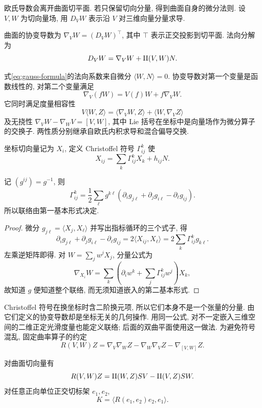 \par{}
欧氏导数会离开曲面切平面. 若只保留切向分量, 得到曲面自身的微分法则. 设 $V,W$ 为切向量场, 用 $D_VW$ 表示沿 $V$ 对三维向量分量求导.
\begin{definition}
曲面的协变导数为 $\nabla_VW=(D_VW)^{\top}$, 其中 $\top$ 表示正交投影到切平面. 法向分解为
\begin{equation}\label{eq:gauss-formula}
 D_VW=\nabla_VW+\mathrm{II}(V,W)N.
\end{equation}
\end{definition}
式\eqref{eq:gauss-formula}的法向系数来自微分 $\langle W,N\rangle=0$. 协变导数对第一个变量是函数线性的, 对第二个变量满足
\[
 \nabla_V(fW)=V(f)W+f\nabla_VW.
\]
它同时满足度量相容性
\[
 V\langle W,Z\rangle=\langle\nabla_VW,Z\rangle+\langle W,\nabla_VZ\rangle
\]
及无挠性 $\nabla_VW-\nabla_WV=[V,W]$, 其中 Lie 括号在坐标中是向量场作为微分算子的交换子. 两性质分别继承自欧氏内积求导和混合偏导交换.
\begin{definition}
坐标切向量记为 $X_i$, 定义 Christoffel 符号 $\Gamma^k_{ij}$ 使
\[
 X_{ij}=\sum_k\Gamma^k_{ij}X_k+h_{ij}N.
\]
\end{definition}
\begin{proposition}\label{prop:christoffel}
记 $(g^{ij})=g^{-1}$, 则
\begin{equation}\label{eq:christoffel}
 \Gamma^k_{ij}=\frac12\sum_\ell g^{k\ell}
 (\partial_i g_{j\ell}+\partial_j g_{i\ell}-\partial_\ell g_{ij}).
\end{equation}
所以联络由第一基本形式决定.
\end{proposition}
\begin{proof}
微分 $g_{j\ell}=\langle X_j,X_\ell\rangle$ 并写出指标循环的三个式子, 得
\[
 \partial_i g_{j\ell}+\partial_j g_{i\ell}-\partial_\ell g_{ij}
 =2\langle X_{ij},X_\ell\rangle
 =2\sum_k\Gamma^k_{ij}g_{k\ell}.
\]
左乘逆矩阵即得. 对 $W=\sum_jw^jX_j$, 分量公式为
\[
 \nabla_{X_i}W=\sum_k\left(\partial_iw^k+\sum_j\Gamma^k_{ij}w^j\right)X_k,
\]
故知道 $g$ 便知道整个联络, 而无须知道嵌入的第二基本形式.
\end{proof}
Christoffel 符号在换坐标时含二阶换元项, 所以它们本身不是一个张量的分量. 由它们定义的协变导数却是坐标无关的几何操作. 用同一公式, 对不一定嵌入三维空间的二维正定光滑度量也能定义联络; 后面的双曲平面使用这一做法.
为避免符号混乱, 固定曲率算子的约定
\[
 R(V,W)Z=\nabla_V\nabla_WZ-\nabla_W\nabla_VZ-\nabla_{[V,W]}Z.
\]
\begin{theorem}[Gauss 方程]\label{thm:gauss}
对曲面切向量有
\begin{equation}\label{eq:gauss-eq}
 R(V,W)Z=\mathrm{II}(W,Z)SV-\mathrm{II}(V,Z)SW.
\end{equation}
对任意正向单位正交切标架 $e_1,e_2$,
\[
 K=\langle R(e_1,e_2)e_2,e_1\rangle.
\]
\end{theorem}
